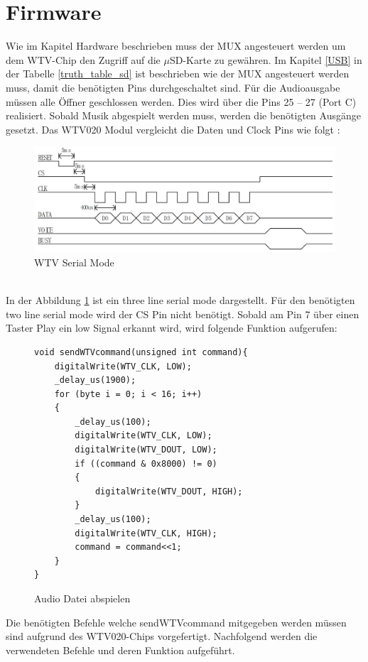 \section{Firmware}
Wie im Kapitel Hardware beschrieben muss der MUX angesteuert werden um dem WTV-Chip den Zugriff auf die $\mu$SD-Karte zu gewähren. Im Kapitel \ref{USB} in der Tabelle \ref{truth_table_sd} ist beschrieben wie der MUX angesteuert werden muss, damit die benötigten Pins durchgeschaltet sind.
Für die Audioausgabe müssen alle Öffner geschlossen werden. Dies wird über die Pins 25 – 27 (Port C) realisiert. Sobald Musik abgespielt werden muss, werden die benötigten Ausgänge gesetzt. Das  WTV020 Modul vergleicht die Daten und Clock Pins wie folgt :
\begin{figure}[h]
	\centering
	\includegraphics[width=15cm]{Bilder/WTV-Serial-Mode.JPG}
	\caption{WTV Serial Mode}
	\label{WTV-Serial}
\end{figure}\\
In der Abbildung \ref{WTV-Serial} ist ein three line serial mode dargestellt. Für den benötigten two line serial mode wird der CS Pin nicht benötigt.
\newpage
Sobald am Pin 7 über einen Taster Play ein low Signal erkannt wird, wird folgende Funktion aufgerufen:

\begin{figure}[h]
	\begin{verbatim}
void sendWTVcommand(unsigned int command){
	digitalWrite(WTV_CLK, LOW);
	_delay_us(1900);
	for (byte i = 0; i < 16; i++)
	{
		_delay_us(100);
		digitalWrite(WTV_CLK, LOW);
		digitalWrite(WTV_DOUT, LOW);
		if ((command & 0x8000) != 0)
		{
			digitalWrite(WTV_DOUT, HIGH);
		}
		_delay_us(100);
		digitalWrite(WTV_CLK, HIGH);
		command = command<<1;
	}
}
	\end{verbatim}
	\caption{Audio Datei abspielen \cite{WTVCODE}}
	\label{WTV-Play}
\end{figure}


Die benötigten Befehle welche sendWTVcommand mitgegeben werden müssen sind aufgrund des WTV020-Chips vorgefertigt.
Nachfolgend werden die verwendeten Befehle und deren Funktion aufgeführt.\\

